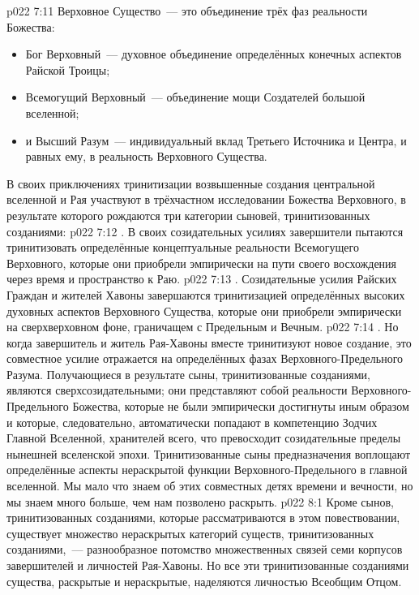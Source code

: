 \vs p022 7:11 \pc Верховное Существо~--- это объединение трёх фаз реальности Божества:\begin{itemize}\item Бог Верховный~--- духовное объединение определённых конечных аспектов Райской Троицы; \item Всемогущий Верховный~--- объединение мощи Создателей большой вселенной; \item и Высший Разум~--- индивидуальный вклад Третьего Источника и Центра, и равных ему, в реальность Верховного Существа.\end{itemize} В своих приключениях тринитизации возвышенные создания центральной вселенной и Рая участвуют в трёхчастном исследовании Божества Верховного, в результате которого рождаются три категории сыновей, тринитизованных созданиями:
\vs p022 7:12 . В своих созидательных усилиях завершители пытаются тринитизовать определённые концептуальные реальности Всемогущего Верховного, которые они приобрели эмпирически на пути своего восхождения через время и пространство к Раю.
\vs p022 7:13 . Созидательные усилия Райских Граждан и жителей Хавоны завершаются тринитизацией определённых высоких духовных аспектов Верховного Существа, которые они приобрели эмпирически на сверхверховном фоне, граничащем с Предельным и Вечным.
\vs p022 7:14 . Но когда завершитель и житель Рая\hyp{}Хавоны вместе тринитизуют новое создание, это совместное усилие отражается на определённых фазах Верховного\hyp{}Предельного Разума. Получающиеся в результате сыны, тринитизованные созданиями, являются сверхсозидательными; они представляют собой реальности Верховного\hyp{}Предельного Божества, которые не были эмпирически достигнуты иным образом и которые, следовательно, автоматически попадают в компетенцию Зодчих Главной Вселенной, хранителей всего, что превосходит созидательные пределы нынешней вселенской эпохи. Тринитизованные сыны предназначения воплощают определённые аспекты нераскрытой функции Верховного\hyp{}Предельного в главной вселенной. Мы мало что знаем об этих совместных детях времени и вечности, но мы знаем много больше, чем нам позволено раскрыть.
\vs p022 8:1 Кроме сынов, тринитизованных созданиями, которые рассматриваются в этом повествовании, существует множество нераскрытых категорий существ, тринитизованных созданиями,~--- разнообразное потомство множественных связей семи корпусов завершителей и личностей Рая\hyp{}Хавоны. Но все эти тринитизованные созданиями существа, раскрытые и нераскрытые, наделяются личностью Всеобщим Отцом.
